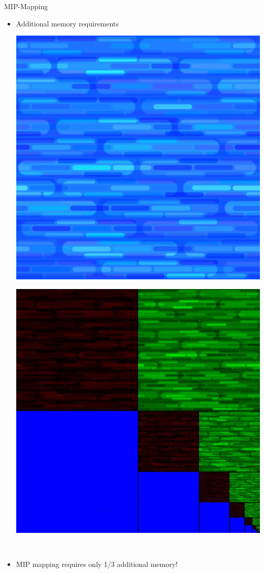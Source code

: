 \documentclass[utf8,stillsansserifmath,fleqn,t]{beamer}
\begin{document}
\begin{frame}
\frametitle{\insertsection}
MIP-Mapping
\begin{itemize}
\item Additional memory requirements\\[1ex]
\begin{minipage}{.22\textwidth}
\includegraphics[width=\textwidth]{./fig/mipmap-0.jpg}
\end{minipage}\hfill
\begin{minipage}{.47\textwidth}
\includegraphics[width=\textwidth]{./fig/mipmap-memory.jpg}
\end{minipage}\\[1ex]
\item MIP mapping requires only 1/3 additional memory!
\end{itemize}
\end{frame}
\end{document}
